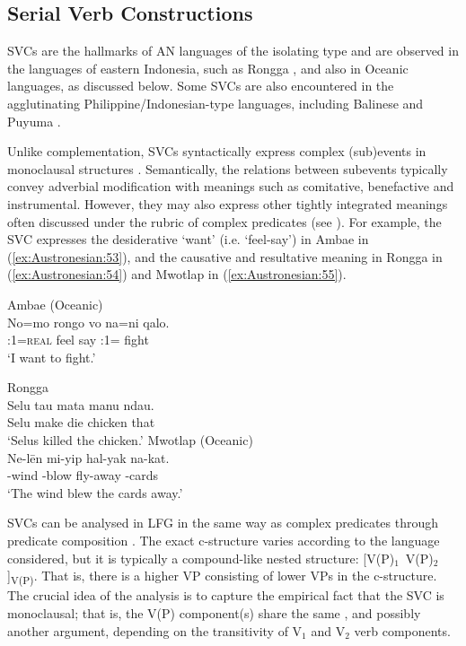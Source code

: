 \documentclass[output=paper,chinesefont]{../langscibook}
\begin{document}
\subsection{Serial Verb Constructions}
\label{sec:Austronesian:5.2}

SVCs are the hallmarks of AN languages of the isolating type and are observed in the languages of eastern Indonesia, such as Rongga \citep{Arka2016}, and also in Oceanic languages, as discussed below. Some SVCs are also encountered in the agglutinating Philippine/Indonesian-type languages, including Balinese \citep{Indrawati2014} and Puyuma \citep{Teng2008}.

Unlike complementation, SVCs syntactically express complex (sub)events in monoclausal structures \citep{Crowley2002,Haspelmath2016}. Semantically, the relations between subevents typically convey adverbial modification with meanings such as comitative, benefactive and instrumental. However, they may also express other tightly integrated meanings often discussed under the rubric of complex predicates (see \citealt{Arka2008b}). For example, the SVC expresses the desiderative `want' (i.e. `feel-say') in Ambae in (\ref{ex:Austronesian:53}), and the causative and resultative meaning in Rongga in (\ref{ex:Austronesian:54}) and Mwotlap in (\ref{ex:Austronesian:55}).

\ea\label{ex:Austronesian:53} Ambae (Oceanic)  \citep[387]{Hyslop2001}\\
\gll
No=mo rongo vo na=ni qalo.\\
\SUBJ:{1\SG}=\textsc{real} feel say \SUBJ:{1\SG}={\IRR} fight\\
\glt`I want to fight.'
\z

\ea\label{ex:Austronesian:54} Rongga   \citep[227]{Arka2016}\\
\gll
Selu tau mata manu ndau. \\
Selu make die chicken that\\
\glt `Selus killed the chicken.'
\z
\ea\label{ex:Austronesian:55} Mwotlap (Oceanic)  \citep[232]{Francois2006}\\
\gll
Ne-lēn mi-yip hal-yak na-kat. \\
{\ART}-wind \PRF-blow fly-away {\ART}-cards\\
\glt`The wind blew the cards away.'
\z

SVCs can be analysed in LFG in the same way as complex predicates through predicate composition \citep{AndrewsManning1999}. The exact c-structure varies according to the language considered, but it is typically a compound-like nested structure: [V(P)$_1$~V(P)$_2$]\textsubscript{\textsc{V(P)}}. That is, there is a higher VP consisting of lower VPs in the c-structure. The crucial idea of the analysis is to capture the empirical fact that the SVC is monoclausal; that is, the V(P) component(s) share the same \SUBJ, and possibly another argument, depending on the transitivity of V$_1$ and V$_2$ verb components.
\end{document}
